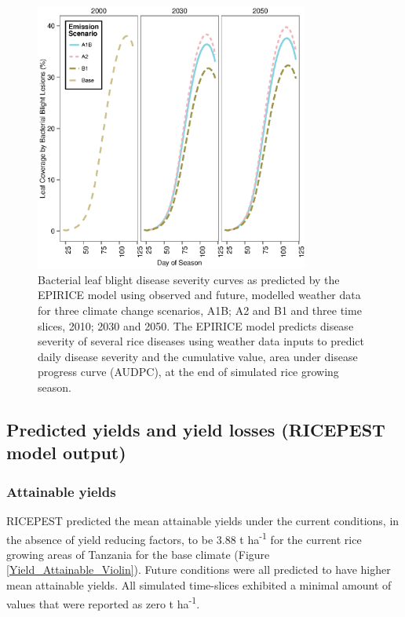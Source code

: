 \documentclass[preprint,review,12pt]{elsarticle}
\begin{document}
    \begin{figure}[H]
      \includegraphics[width = 90mm]{figures/BB}
      \caption{Bacterial leaf blight disease severity curves as predicted by the EPIRICE model using observed and future, modelled weather data for three climate change scenarios, A1B; A2 and B1 and three time slices, 2010; 2030 and 2050. The EPIRICE model predicts disease severity of several rice diseases using weather data inputs to predict daily disease severity and the cumulative value, area under disease progress curve (AUDPC), at the end of simulated rice growing season.}
        \label{BBCurves}
    \end{figure}
    
    \subsection{Predicted yields and yield losses (RICEPEST model output)}
    \subsubsection{Attainable yields}
    RICEPEST predicted the mean attainable yields under the current conditions, in the absence of yield reducing factors, to be 3.88 t ha\textsuperscript{-1} for the current rice growing areas of Tanzania for the base climate (Figure \ref{Yield_Attainable_Violin}). Future conditions were all predicted to have higher mean attainable yields. All simulated time-slices exhibited a minimal amount of values that were reported as zero t ha\textsuperscript{-1}.
    
\end{document}
